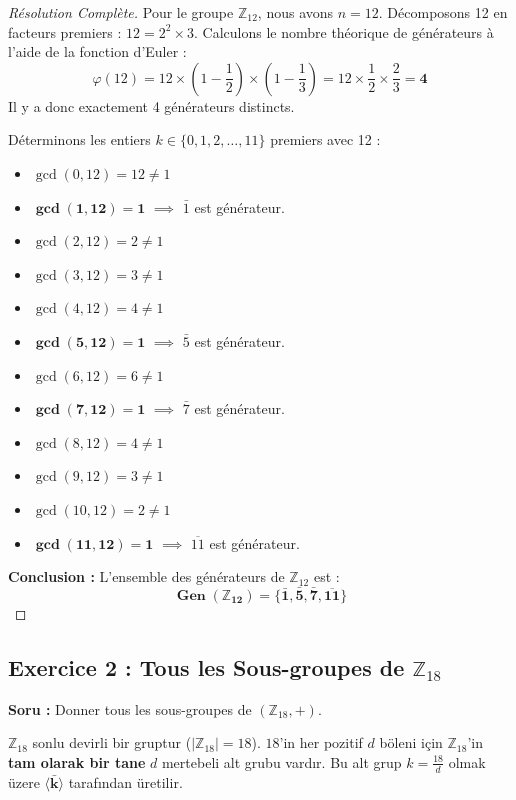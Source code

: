 \documentclass[12pt,a4paper]{report}
\begin{document}
\begin{proof}[Résolution Complète]
Pour le groupe $\mathbb{Z}_{12}$, nous avons $n = 12$.  
Décomposons 12 en facteurs premiers : $12 = 2^2 \times 3$.  
Calculons le nombre théorique de générateurs à l'aide de la fonction d'Euler :
\[ \varphi(12) = 12 \times \left(1 - \frac{1}{2}\right) \times \left(1 - \frac{1}{3}\right) = 12 \times \frac{1}{2} \times \frac{2}{3} = \mathbf{4} \]
Il y a donc exactement 4 générateurs distincts.

Déterminons les entiers $k \in \{0, 1, 2, \dots, 11\}$ premiers avec 12 :
\begin{itemize}
    \item $\gcd(0, 12) = 12 \neq 1$
    \item $\mathbf{\gcd(1, 12) = 1}$ $\implies$ $\bar{1}$ est générateur.
    \item $\gcd(2, 12) = 2 \neq 1$
    \item $\gcd(3, 12) = 3 \neq 1$
    \item $\gcd(4, 12) = 4 \neq 1$
    \item $\mathbf{\gcd(5, 12) = 1}$ $\implies$ $\bar{5}$ est générateur.
    \item $\gcd(6, 12) = 6 \neq 1$
    \item $\mathbf{\gcd(7, 12) = 1}$ $\implies$ $\bar{7}$ est générateur.
    \item $\gcd(8, 12) = 4 \neq 1$
    \item $\gcd(9, 12) = 3 \neq 1$
    \item $\gcd(10, 12) = 2 \neq 1$
    \item $\mathbf{\gcd(11, 12) = 1}$ $\implies$ $\overline{11}$ est générateur.
\end{itemize}
\textbf{Conclusion :} L'ensemble des générateurs de $\mathbb{Z}_{12}$ est :
\[ \mathbf{\operatorname{Gen}(\mathbb{Z}_{12}) = \{\bar{1}, \bar{5}, \bar{7}, \overline{11}\}} \]
\end{proof}

\vspace{0.5cm}

\subsection*{Exercice 2 : Tous les Sous-groupes de $\mathbb{Z}_{18}$}
\textbf{Soru :} Donner tous les sous-groupes de $(\mathbb{Z}_{18}, +)$.

\begin{tcolorbox}[colback=teal!5!white,colframe=teal!80!black,title=Teorem : Devirli Grupların Alt Grup Yapısı (Treillis des sous-groupes)]
$\mathbb{Z}_{18}$ sonlu devirli bir gruptur ($|\mathbb{Z}_{18}| = 18$).  
$18$'in her pozitif $d$ böleni için $\mathbb{Z}_{18}$'in \textbf{tam olarak bir tane} $d$ mertebeli alt grubu vardır.  
Bu alt grup $k = \frac{18}{d}$ olmak üzere $\mathbf{\langle \bar{k} \rangle}$ tarafından üretilir.
\end{tcolorbox}
\end{document}
